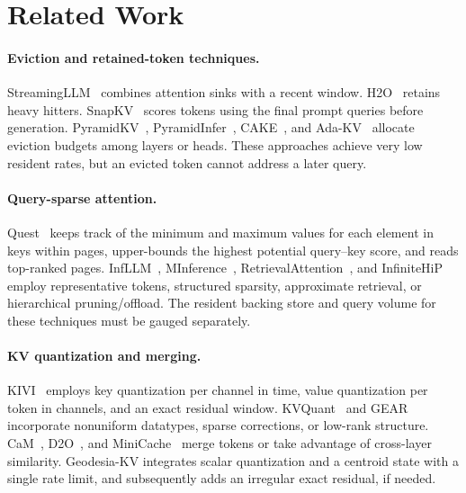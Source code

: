 \documentclass[10pt,twocolumn]{article}
\newcommand{\method}{Geodesia-KV}
\begin{document}
\section{Related Work}

\paragraph{Eviction and retained-token techniques.}
StreamingLLM~\cite{xiao2024streaming} combines attention sinks with a recent window. H2O~\cite{zhang2023h2o} retains heavy hitters. SnapKV~\cite{li2024snapkv} scores tokens using the final prompt queries before generation. PyramidKV~\cite{cai2024pyramidkv}, PyramidInfer~\cite{yang2024pyramidinfer}, CAKE~\cite{qin2025cake}, and Ada-KV~\cite{feng2024adakv} allocate eviction budgets among layers or heads. These approaches achieve very low resident rates, but an evicted token cannot address a later query.

\paragraph{Query-sparse attention.}
Quest~\cite{tang2024quest} keeps track of the minimum and maximum values for each element in keys within pages, upper-bounds the highest potential query--key score, and reads top-ranked pages. InfLLM~\cite{xiao2024infllm}, MInference~\cite{jiang2024minference}, RetrievalAttention~\cite{liu2024retrievalattention}, and InfiniteHiP~\cite{lee2025infinitehip} employ representative tokens, structured sparsity, approximate retrieval, or hierarchical pruning/offload. The resident backing store and query volume for these techniques must be gauged separately.

\paragraph{KV quantization and merging.}
KIVI~\cite{liu2024kivi} employs key quantization per channel in time, value quantization per token in channels, and an exact residual window. KVQuant~\cite{hooper2024kvquant} and GEAR~\cite{kang2024gear} incorporate nonuniform datatypes, sparse corrections, or low-rank structure. CaM~\cite{zhang2024cam}, D2O~\cite{wan2024d2o}, and MiniCache~\cite{liu2024minicache} merge tokens or take advantage of cross-layer similarity. \method{} integrates scalar quantization and a centroid state with a single rate limit, and subsequently adds an irregular exact residual, if needed.
\end{document}
